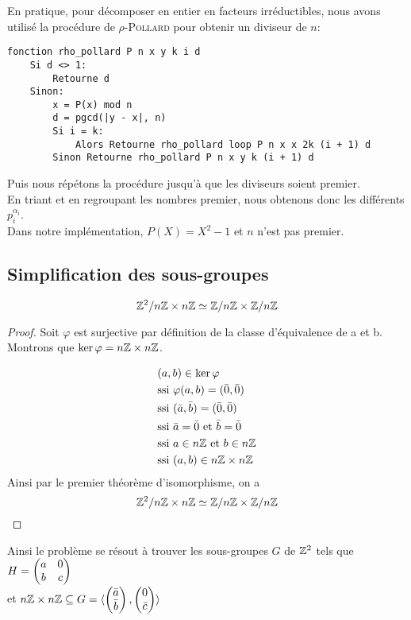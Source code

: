 \documentclass[11pt]{article}
\begin{document}
En pratique, pour décomposer en entier en facteurs irréductibles, nous avons utilisé la procédure de
\textsc{$\rho$-Pollard} pour obtenir un diviseur de $n$:
\begin{lstlisting}
fonction rho_pollard P n x y k i d
    Si d <> 1:
        Retourne d
    Sinon:
        x = P(x) mod n
        d = pgcd(|y - x|, n)
        Si i = k:
            Alors Retourne rho_pollard loop P n x x 2k (i + 1) d
        Sinon Retourne rho_pollard P n x y k (i + 1) d
\end{lstlisting}
Puis nous répétons la procédure jusqu'à que les diviseurs soient premier.\\
En triant et en regroupant les nombres premier, nous obtenons donc les différents $p^{\alpha_i}_i$.\\
Dans notre implémentation, $P(X) = X^2 - 1$ et $n$ n'est pas premier.

\newpage
\subsection{Simplification des sous-groupes}

\begin{proposition}
	$$\mathbb Z^2/n\mathbb Z \times n\mathbb Z \simeq \mathbb Z/n\mathbb Z \times \mathbb Z/n\mathbb Z $$
\end{proposition}
\begin{proof}
	Soit 
	$\varphi$ est surjective par définition de la classe d'équivalence de a et b.
	Montrons que $\ker \varphi = n\mathbb Z \times n\mathbb Z$.

	\begin{equation*}
		\begin{split}
			&(a,b) \in \ker \varphi \\
			&\text{ssi } \varphi(a,b) = (\bar 0, \bar 0)\\
			&\text{ssi } (\bar a, \bar b) = (\bar 0, \bar 0)\\
			&\text{ssi } \bar a = \bar 0 \text{ et } \bar b = \bar 0\\
			&\text{ssi } a \in n\mathbb Z \text{ et } b \in n\mathbb Z\\
			&\text{ssi } (a,b) \in  n\mathbb Z \times n\mathbb Z
		\end{split}
	\end{equation*}
	Ainsi par le premier théorème d'isomorphisme, on a
	$$\mathbb Z^2/n\mathbb Z \times n\mathbb Z \simeq \mathbb Z/n\mathbb Z \times \mathbb Z/n\mathbb Z $$
\end{proof}
Ainsi le problème se résout à trouver les sous-groupes $G$ de $\mathbb Z^2$ tels que
$H = \begin{pmatrix} a & 0\\ b & c \end{pmatrix}$\\
et
$n\mathbb Z \times n\mathbb Z \subseteq G = \langle \begin{pmatrix} \bar a\\ \bar b \end{pmatrix}, \begin{pmatrix} 0\\ \bar c \end{pmatrix} \rangle$
\end{document}
